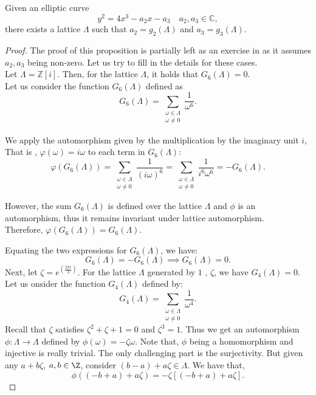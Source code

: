 \begin{proposition}
    Given an elliptic curve $$
y^{2}=4 x^{3}-a_{2}x-a_{3} \quad a_{2}, a_{3} \in \mathbb{C},
$$ there exists a lattice $\Lambda$ such that $a_{2}=g_{2}(\Lambda)$ and $a_{3}=g_{3}(\Lambda)$.
\begin{proof}
The proof of this proposition is partially left as an exercise in \cite{diamond2005first} as it assumes $a_2,a_3$ being non-zero. Let us try to fill in the details for these cases. \\
Let $\Lambda=\mathbb{Z}[i]$. Then, for the lattice \( \Lambda \), it holds that \( G_6(\Lambda) = 0 \). \\

Let us  consider the function \( G_6(\Lambda) \) defined as
   \[
   G_6(\Lambda) = \sum_{\substack{\omega \in \Lambda \\ \omega \neq 0}} \frac{1}{\omega^6}.
   \]
   
   We apply the automorphism given by the multiplication by the imaginary unit $i$, That is ,  \( \varphi(\omega) = i \omega \) to each term in \( G_6(\Lambda) \):
   \[
   \varphi\left(G_{6}(\Lambda)\right) = \sum_{\substack{\omega \in \Lambda \\ \omega \neq 0}} \frac{1}{(i \omega)^6} = \sum_{\substack{\omega \in \Lambda \\ \omega \neq 0}} \frac{1}{i^6 \omega^6} = -G_6(\Lambda).
   \]

   However, the sum \( G_6(\Lambda) \) is defined over the lattice \( \Lambda \) and $\phi$ is an automorphism, thus it remains invariant under lattice automorphism. \\
   
   Therefore, \( \varphi\left(G_{6}(\Lambda)\right) = G_6(\Lambda) \).

   Equating the two expressions for \( G_6(\Lambda) \), we have:
   \[
   G_6(\Lambda) = -G_6(\Lambda) \implies G_6(\Lambda) = 0.
   \] 
Next, let $\zeta=e^(\frac{2\pi i }{3}).$ For the lattice \( \Lambda \) generated by \( 1 \) , \( \zeta \), we have \( G_4(\Lambda) = 0 \).
Let us onsider the function \( G_4(\Lambda) \) defined by:
   \[
   G_4(\Lambda) = \sum_{\substack{\omega \in \Lambda \\ \omega \neq 0}} \frac{1}{\omega^4}.
   \] Recall that \( \zeta \) satisfies \( \zeta^2 + \zeta + 1 = 0 \) and \( \zeta^3 = 1 \). Thus we get an automorphism \( \phi: \Lambda \rightarrow \Lambda \) defined by \( \phi(\omega) = -\zeta \omega \). Note that, $\phi$ being a homomorphism and injective is really trivial. The only challenging part is the surjectivity. But given any $a+b\zeta$, $a,b \in \Z$, consider $(b-a)+a\zeta \in \Lambda$.
   We have that,
\[
\phi((-b+a)+a\zeta) = -\zeta \left[ (-b+a) + a\zeta \right].
\]


\end{proof}
\end{proposition}
